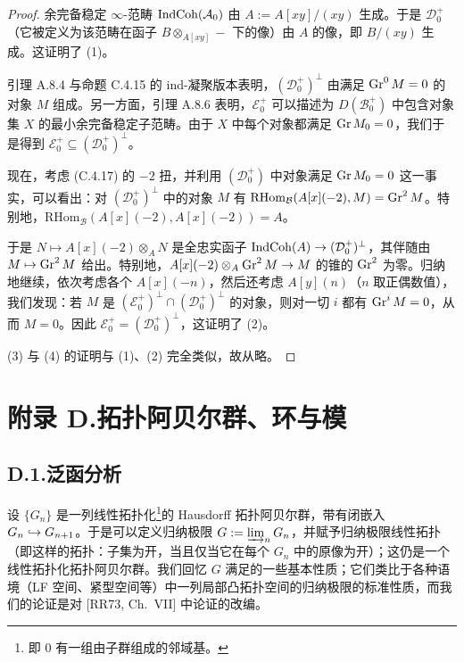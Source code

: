 \begin{proof}
余完备稳定 $\infty$-范畴 $\operatorname{IndCoh}(\mathcal A_0)$ 由 $A:=A[xy]/(xy)$ 生成。于是 $\mathcal D_0^+$（它被定义为该范畴在函子 $B\otimes_{A[xy]}-$ 下的像）由 $A$ 的像，即 $B/(xy)$ 生成。这证明了 (1)。

引理 A.8.4 与命题 C.4.15 的 ind-凝聚版本表明，$(\mathcal D_0^+)^{\perp}$ 由满足 $\operatorname{Gr}^0M=0$ 的对象 $M$ 组成。另一方面，引理 A.8.6 表明，$\mathcal E_0^+$ 可以描述为 $D(\mathcal B_0^+)$ 中包含对象集 $X$ 的最小余完备稳定子范畴。由于 $X$ 中每个对象都满足 $\operatorname{Gr} M_0=0$，我们于是得到 $\mathcal E_0^+\subseteq(\mathcal D_0^+)^{\perp}$。

现在，考虑 (C.4.17) 的 $-2$ 扭，并利用 $(\mathcal D_0^+)$ 中对象满足 $\operatorname{Gr} M_0=0$ 这一事实，可以看出：对 $(\mathcal D_0^+)^{\perp}$ 中的对象 $M$ 有 $\mathrm{RHom}_{\mathcal B}(A[x](-2),M)=\operatorname{Gr}^2M$。特别地，$\mathrm{RHom}_{\mathcal B}(A[x](-2),A[x](-2))=A$。


于是 $N\mapsto A[x](-2)\otimes_AN$ 是全忠实函子 $\operatorname{IndCoh}(A)\to(\mathcal D_0^+)^{\perp}$，其伴随由 $M\mapsto\operatorname{Gr}^2M$ 给出。特别地，$A[x](-2)\otimes_A\operatorname{Gr}^2M\to M$ 的锥的 $\operatorname{Gr}^2$ 为零。归纳地继续，依次考虑各个 $A[x](-n)$，然后还考虑 $A[y](n)$（$n$ 取正偶数值），我们发现：若 $M$ 是 $(\mathcal E_0^+)^{\perp}\cap(\mathcal D_0^+)^{\perp}$ 的对象，则对一切 $i$ 都有 $\operatorname{Gr}^iM=0$，从而 $M=0$。因此 $\mathcal E_0^+=(\mathcal D_0^+)^{\perp}$，这证明了 (2)。

(3) 与 (4) 的证明与 (1)、(2) 完全类似，故从略。
\end{proof}

\section*{附录 D.\quad 拓扑阿贝尔群、环与模}

\subsection*{D.1.\quad 泛函分析}

设 $\{G_n\}$ 是一列线性拓扑化\footnote{即 $0$ 有一组由子群组成的邻域基。}的 Hausdorff 拓扑阿贝尔群，带有闭嵌入 $G_n\hookrightarrow G_{n+1}$。于是可以定义归纳极限 $G:=\varinjlim_n G_n$，并赋予归纳极限线性拓扑（即这样的拓扑：子集为开，当且仅当它在每个 $G_n$ 中的原像为开）；这仍是一个线性拓扑化拓扑阿贝尔群。我们回忆 $G$ 满足的一些基本性质；它们类比于各种语境（LF 空间、紧型空间等）中一列局部凸拓扑空间的归纳极限的标准性质，而我们的论证是对 [RR73, Ch.~VII] 中论证的改编。

